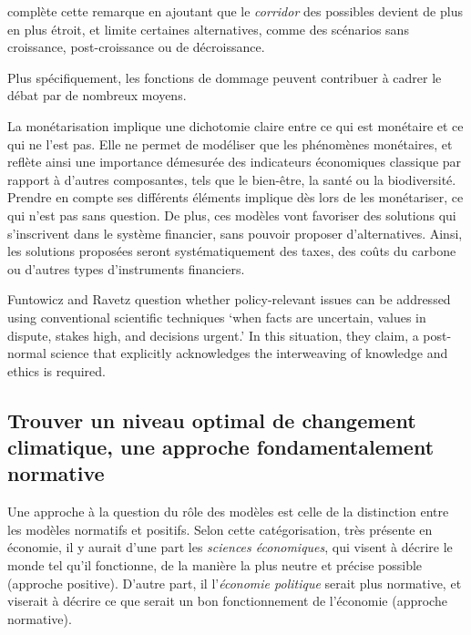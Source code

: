 \textcite{cointe_ar6_2024} complète cette remarque en ajoutant que le \emph{corridor} des possibles devient de plus en plus étroit, et limite certaines alternatives, comme des scénarios sans croissance, post-croissance ou de décroissance. 

Plus spécifiquement, les fonctions de dommage peuvent contribuer à cadrer le débat par de nombreux moyens. 

La monétarisation  implique une dichotomie claire entre ce qui est monétaire et ce qui ne l'est pas. Elle ne permet de modéliser que les phénomènes monétaires, et reflète ainsi une importance démesurée des indicateurs économiques classique par rapport à d'autres composantes, tels que le bien-être, la santé ou la biodiversité. Prendre en compte ses différents éléments implique dès lors de les monétariser, ce qui n'est pas sans question. 
De plus, ces modèles vont favoriser des solutions qui s'inscrivent dans le système financier, sans pouvoir proposer d'alternatives. Ainsi, les solutions proposées seront systématiquement des taxes, des coûts du carbone ou d'autres types d'instruments financiers.



\begin{authoredquote}
    Funtowicz and Ravetz question whether policy-relevant issues can be addressed using conventional scientific techniques ‘when facts are uncertain, values in dispute, stakes high, and decisions urgent.’  In this situation, they claim, a post-normal science that explicitly acknowledges the interweaving of knowledge and ethics is required.
\end{authoredquote}


\subsection{Trouver un niveau optimal de changement climatique, une approche fondamentalement normative}

Une approche à la question du rôle des modèles est celle de la distinction entre les modèles normatifs et positifs. Selon cette catégorisation, très présente en économie, il y aurait d'une part les \emph{sciences économiques}, qui visent à décrire le monde tel qu'il fonctionne, de la manière la plus neutre et précise possible (approche positive). D'autre part, il l'\emph{économie politique} serait plus normative, et viserait à décrire ce que serait un bon fonctionnement de l'économie (approche normative). 

